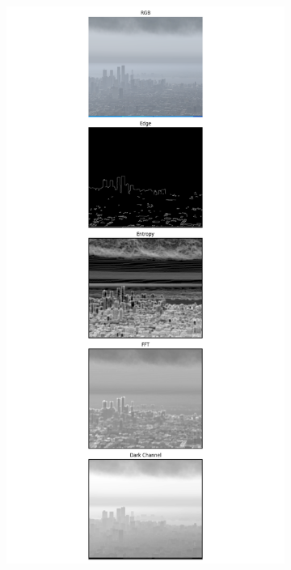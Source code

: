 \begin{figure}
\begin{subfigure}[b]{0.15\textwidth}
      \label{subfig:bin2}
          \caption{}
    \end{subfigure}
    \begin{subfigure}[b]{0.15\textwidth}
      \includegraphics[width=\textwidth, trim={7.5cm 0 7.5cm 0},clip]{imgs/examples/exp_0_featuresMiles_4.038922788223744_featuresM_6500_features.png}

\end{subfigure}
\end{figure}
